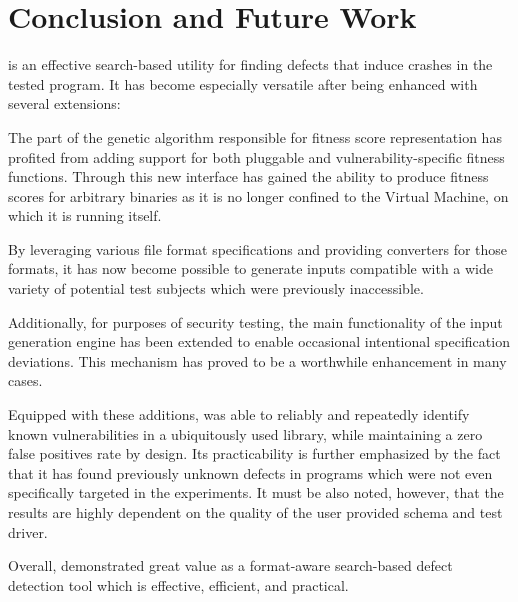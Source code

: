 \section{Conclusion and Future Work}
\label{sec:conclusion}
\xmlmate is an effective search-based utility for finding defects that induce crashes in the tested program. It
has become especially versatile after being enhanced with several extensions:

The part of the genetic algorithm responsible for fitness score representation has profited from adding
support for both pluggable and vulnerability-specific fitness functions. Through this new interface \xmlmate
has gained the ability to produce fitness scores for arbitrary binaries as it is no longer confined to
the \java Virtual Machine, on which it is running itself. 

By leveraging various file format specifications and
providing converters for those formats, it has now become possible to generate inputs compatible with a wide
variety of potential test subjects which were previously inaccessible. 

Additionally, for purposes of security testing, the main
functionality of the input generation engine has been extended to enable occasional intentional specification
deviations.
This mechanism has proved to be a worthwhile enhancement in many cases.

Equipped with these additions, \xmlmate was able to reliably and repeatedly identify known vulnerabilities in
a ubiquitously used library, while maintaining a zero false positives rate by design.
Its practicability is further emphasized by the fact that it has found previously unknown defects in programs
which were not even specifically targeted in the experiments. 
It must be also noted, however, that the results are highly dependent on the quality of the user provided
schema and test driver.

\begin{mdframed}
Overall, \xmlmate demonstrated great value as a format-aware search-based defect detection tool which
is effective, efficient, and practical.
\end{mdframed}